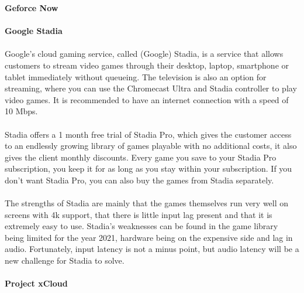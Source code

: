 \textbf{Geforce Now}\\\\
\textbf{Google Stadia}\\\\
Google's cloud gaming service, called (Google) Stadia, is a service that allows customers to stream video games through their desktop, laptop, smartphone or tablet immediately without queueing. The television is also an option for streaming, where you can use the Chromecast Ultra and Stadia controller to play video games. It is recommended to have an internet connection with a speed of 10 Mbps.\\\\
Stadia offers a 1 month free trial of Stadia Pro, which gives the customer access to an endlessly growing library of games playable with no additional costs, it also gives the client monthly discounts. Every game you save to your Stadia Pro subscription, you keep it for as long as you stay within your subscription. If you don't want Stadia Pro, you can also buy the games from Stadia separately.\\\\
The strengths of Stadia are mainly that the games themselves run very well on screens with 4k support, that there is little input lag present and that it is extremely easy to use. Stadia's weaknesses can be found in the game library being limited for the year 2021, hardware being on the expensive side and lag in audio. Fortunately, input latency is not a minus point, but audio latency will be a new challenge for Stadia to solve.\\\\
\textbf{Project xCloud}\\\\